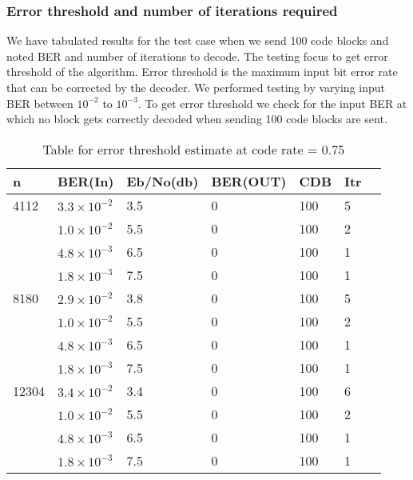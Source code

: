 \subsubsection{ Error threshold  and number of iterations required  }
We have tabulated results for the test case when we send 100 code blocks and noted BER and number of iterations to decode.
The testing focus to get error threshold of the algorithm. Error threshold is the maximum input bit error rate that can be corrected by the decoder. We performed testing by varying input BER between $10^{-2}$ to $10^{-3}$. To get error threshold we check for the input BER at which no block gets correctly decoded when sending 100 code blocks are sent.  
\begin{table}[H]
\centering
\caption[Table for error threshold estimate at code rate = 0.75, Min Sum decode using quasi cyclic matrix]{Table for error threshold estimate at  code rate = 0.75 }
\begin{tabular}{|l|l|l|l|l|l|l|}
\hline
n     & BER(In) 			& Eb/No(db) & BER(OUT) & CDB  & Itr \\ \hline
4112  & $3.3\times10^{-2}$       & 3.5   & 0   & 100 & 5         \\  \hline
	  & $1.0\times10^{-2}$       & 5.5   & 0   & 100 & 2         \\ 
      &	$4.8\times10^{-3}$		& 6.5   & 0   & 100 & 1         \\
      &	$1.8\times10^{-3}$		& 7.5   & 0   & 100 & 1         \\ \hline
8180  &	$2.9\times10^{-2}$    	& 3.8   & 0   & 100 & 5         \\  \hline
      &	$1.0\times10^{-2}$    	& 5.5   & 0   & 100 & 2         \\ 
      &	$4.8\times10^{-3}$		& 6.5   & 0   & 100 & 1         \\
      &	$1.8\times10^{-3}$		& 7.5   & 0   & 100 & 1         \\ \hline
12304 &	$3.4\times10^{-2}$		& 3.4   & 0   & 100 & 6         \\ \hline
	  &	$1.0\times10^{-2}$		& 5.5   & 0   & 100 & 2         \\  
      &	$4.8\times10^{-3}$		& 6.5   & 0   & 100 & 1         \\ 
      &	$1.8\times10^{-3}$		& 7.5   & 0   & 100 & 1         \\ \hline
\end{tabular}
\label{tab:nameForThisTable}
\end{table}


